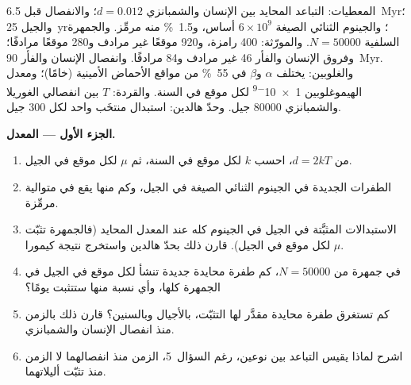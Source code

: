 \begin{problem}
\label{pb:b3:molecular-evolution:1}
المعطيات: التباعد المحايد بين الإنسان والشمبانزي $d = 0.012$؛
والانفصال قبل \qty{6.5}{Myr}؛ والجيل \qty{25}{yr}؛ والجينوم
الثنائي الصيغة $6\times
10^{9}$ أساس، و\qty{1.5}{\%} منه مرمِّز. والجمهرة السلفية $N =
\num{50000}$. والمورّثة: 400 رامزة، و920 موقعًا غير مرادف و280
موقعًا مرادفًا؛ وفروق الإنسان والفأر 46 غير مرادف و84 مرادفًا.
وانفصال الإنسان والفأر \qty{90}{Myr}. والغلوبين: يختلف $\alpha$ و$\beta$ في
\qty{55}{\%} من مواقع الأحماض الأمينية (خامًا)؛ ومعدل الهيموغلوبين \num{1e-9} لكل
موقع في السنة. والقردة: $T$ بين انفصالي الغوريلا والشمبانزي
\num{80000} جيل. وحدّ هالدين: استبدال منتخَب واحد لكل
300 جيل.

\medskip
\noindent\textbf{الجزء الأول --- المعدل.}
\begin{enumerate}
  \item من $d = 2kT$، احسب $k$ لكل موقع في السنة، ثم $\mu$ لكل
        موقع في الجيل.
  \item الطفرات الجديدة في الجينوم الثنائي الصيغة في الجيل،
        وكم منها يقع في متوالية مرمِّزة.
  \item الاستبدالات المثبَّتة في الجيل في الجينوم كله عند
        المعدل المحايد (فالجمهرة تثبّت $\mu$ لكل موقع في
        الجيل). قارن ذلك بحدّ هالدين واستخرج نتيجة كيمورا.
  \item في جمهرة من $N = \num{50000}$، كم طفرة محايدة جديدة
        تنشأ لكل موقع في الجيل في الجمهرة كلها،
        وأي نسبة منها ستتثبت يومًا؟
  \item كم تستغرق طفرة محايدة مقدَّر لها التثبّت،
        بالأجيال وبالسنين؟ قارن ذلك بالزمن منذ انفصال
        الإنسان والشمبانزي.
  \item اشرح لماذا يقيس التباعد بين نوعين، رغم السؤال~5،
        الزمن منذ انفصالهما لا الزمن منذ تثبّت أليلاتهما.
\end{enumerate}


\end{problem}

